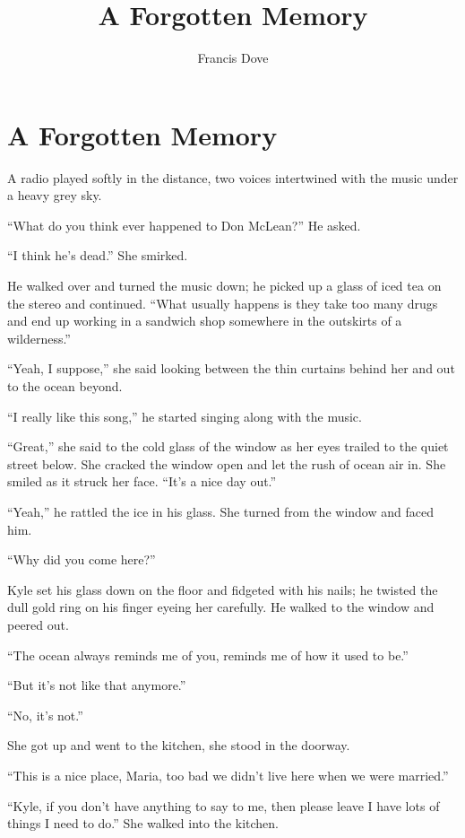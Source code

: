 \documentclass[
]{article}
\title{A Forgotten Memory}
\author{Francis Dove}
\date{}
\begin{document}
\maketitle

\section{A Forgotten Memory}\label{a-forgotten-memory}

A radio played softly in the distance, two voices intertwined with the
music under a heavy grey sky.

``What do you think ever happened to Don McLean?'' He asked.

``I think he's dead.'' She smirked.

He walked over and turned the music down; he picked up a glass of iced
tea on the stereo and continued. ``What usually happens is they take too
many drugs and end up working in a sandwich shop somewhere in the
outskirts of a wilderness.''

``Yeah, I suppose,'' she said looking between the thin curtains behind
her and out to the ocean beyond.

``I really like this song,'' he started singing along with the music.

``Great,'' she said to the cold glass of the window as her eyes trailed
to the quiet street below. She cracked the window open and let the rush
of ocean air in. She smiled as it struck her face. ``It's a nice day
out.''

``Yeah,'' he rattled the ice in his glass. She turned from the window
and faced him.

``Why did you come here?''

Kyle set his glass down on the floor and fidgeted with his nails; he
twisted the dull gold ring on his finger eyeing her carefully. He walked
to the window and peered out.

``The ocean always reminds me of you, reminds me of how it used to be.''

``But it's not like that anymore.''

``No, it's not.''

She got up and went to the kitchen, she stood in the doorway.

``This is a nice place, Maria, too bad we didn't live here when we were
married.''

``Kyle, if you don't have anything to say to me, then please leave I
have lots of things I need to do.'' She walked into the kitchen.
\end{document}
